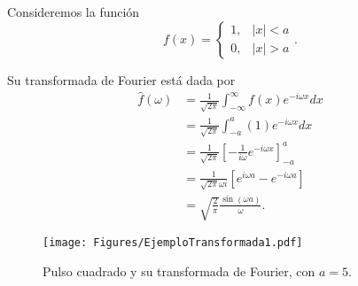 \begin{ejemplo} \label{PulsoCuadrado}
Consideremos la función 
\begin{equation}
f(x) = \left\{ \begin{array}{cl}
     1,& |x|<a  \\
     0,& |x|> a
\end{array} \right..   
\end{equation}

Su transformada de Fourier está dada por
\begin{align}
    \hat{f}(\omega) &= \frac{1}{\sqrt{2\pi}} \int_{-\infty}^{\infty} f(x) e^{-i\omega x} dx \nonumber \\
    &= \frac{1}{\sqrt{2\pi}} \int_{-a}^a (1)  e^{-i\omega x} dx \nonumber \\
    &= \frac{1}{\sqrt{2\pi}} \left[ - \frac{1}{i\omega} e^{-i\omega x} \right]_{-a}^a \nonumber\\
    &= \frac{1}{\sqrt{2\pi} \omega i} [e^{i\omega a} - e^{-i\omega a}] \nonumber\\
    &= \sqrt{\frac{2}{\pi}} \frac{\sin(\omega a)}{\omega}. \label{eq:TransPulsoCuadrado}
\end{align}

\begin{figure}[H]
    \centering
    \texttt{[image: Figures/EjemploTransformada1.pdf]}
    \caption{Pulso cuadrado y su transformada de Fourier, con $a = 5$.}
    \label{Espectro2}
\end{figure}
\end{ejemplo}

